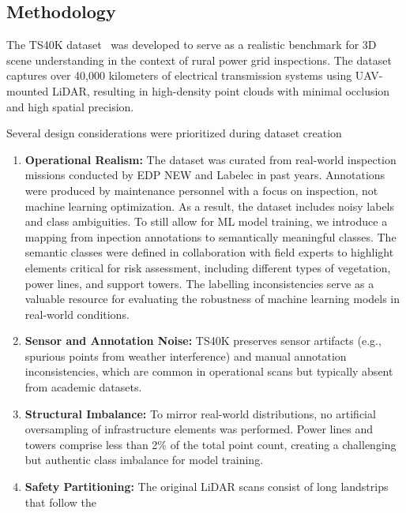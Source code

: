 \subsection{Methodology}

The TS40K dataset~\cite{Lavado_2025_WACV} was developed to serve as a realistic
benchmark for 3D scene understanding in the context of rural power grid
inspections. The dataset captures over 40,000 kilometers of electrical
transmission systems using UAV-mounted LiDAR, resulting in high-density point
clouds with minimal occlusion and high spatial precision.

Several design considerations were prioritized during dataset creation
%
\begin{enumerate}
      \item \textbf{Operational Realism:}
            The dataset was curated from real-world inspection missions conducted by
            EDP NEW and Labelec in past years. Annotations were produced by maintenance
            personnel with a focus on inspection, not machine learning
            optimization.
            As a result, the dataset includes noisy labels and class ambiguities.
            To still allow for ML model training, we introduce a mapping from inpection
            annotations to semantically meaningful classes. The semantic classes were defined
            in collaboration with field experts to highlight elements critical for risk
            assessment, including different types of vegetation, power lines,
            and support towers.
            The labelling inconsistencies serve as a valuable resource for
            evaluating the robustness of machine learning models in real-world
            conditions.
      \item \textbf{Sensor and Annotation Noise:}
            TS40K preserves sensor artifacts (e.g., spurious points from weather interference)
            and manual annotation inconsistencies, which are common in operational scans but
            typically absent from academic datasets.
      \item \textbf{Structural Imbalance:}
            To mirror real-world distributions,
            no artificial oversampling of infrastructure elements was performed.
            Power lines and towers comprise less than 2\% of the total point count,
            creating a challenging but authentic class imbalance for model training.
      \item \textbf{Safety Partitioning:}
            The original LiDAR scans consist of long landstrips that follow the

\end{enumerate}
